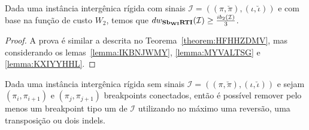 \begin{theorem}\label{theorem:IXYMBAWM}
Dada uma instância intergênica rígida com sinais $\mathcal{I}=((\pi,\breve\pi),(\iota,\breve\iota))$ e com base na função de custo $W_2$, temos que $dw_{\textbf{Sb\textsubscript{WI}RTI}}(\mathcal{I}) \ge \frac{ib_2(\mathcal{I})}{3}$.
\begin{proof}
A prova é similar a descrita no Teorema~\ref{theorem:HFHHZDMV}, mas considerando os lemas~\ref{lemma:IKBNJWMY}, \ref{lemma:MYVALTSG} e \ref{lemma:KXIYYHHL}.
\end{proof}
\end{theorem}

\begin{lemma}\label{lemma:XLFWKWTV}
Dada uma instância intergênica rígida sem sinais $\mathcal{I}=((\pi,\breve\pi),(\iota,\breve\iota))$ e sejam $(\pi_i,\pi_{i+1})$ e $(\pi_j,\pi_{j+1})$ breakpoints conectados, então é possível remover pelo menos um breakpoint tipo um de $\mathcal{I}$ utilizando no máximo uma reversão, uma transposição ou dois indels.
\end{lemma}
